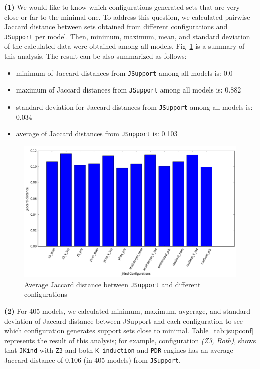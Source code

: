\textbf{(1)} We would like to know which configurations generated sets that are very close or far to the minimal one. To address this question, we calculated pairwise Jaccard distance between sets obtained from different configurations and \texttt{JSupport} per model. Then, minimum, maximum, mean, and standard deviation of the calculated data were obtained among all models. Fig~\ref{fig:jsupjadis} is a summary of this analysis. The result can be also summarized as follows:
\begin{itemize}
  \item minimum of Jaccard distances from \texttt{JSupport} among all models is: 0.0
  \item maximum of Jaccard distances from \texttt{JSupport} among all models is: 0.882
  \item standard deviation for Jaccard distances from \texttt{JSupport} among all models is: 0.034
  \item average of Jaccard distances from \texttt{JSupport} is: 0.103
\end{itemize}


\begin{figure}
  \centering
  \includegraphics[width=\textwidth]{figs/jsupport_analyses.png}
  \caption{\small{Average Jaccard distance between \texttt{JSupport} and different configurations}}\label{fig:jsupjadis}
\end{figure}

\vspace{6pt}
\noindent{}
 \vspace{9pt}
 
\textbf{(2)} For 405 models, we calculated minimum, maximum, avgerage, and standard deviation of Jaccard distance between JSupport and each configuration
to see which configuration generates support sets close to minimal. 
Table~\ref{tab:jsupconf} represents the result of this analysis; for example, configuration \emph{(Z3, Both)}, shows that \texttt{JKind} with \texttt{Z3} and both \texttt{K-induction} and \texttt{PDR} engines has an average Jaccard distance of 0.106 (in 405 models) from \texttt{JSupport}.


